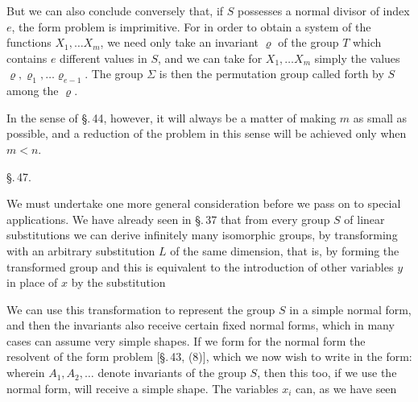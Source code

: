 

But we can also conclude conversely that, if $S$ possesses a normal divisor of index $e$, the form problem is imprimitive. For in order to obtain a system of the functions $X_1, \ldots X_m$, we need only take an invariant $\varrho$ of the group $T$ which contains $e$ different values in $S$, and we can take for $X_1, \ldots X_m$ simply the values $\varrho, \varrho_1, \ldots \varrho_{e-1}$. The group $\Sigma$ is then the permutation group called forth by $S$ among the $\varrho$.

In the sense of \S.\,44, however, it will always be a matter of making $m$ as small as possible, and a reduction of the problem in this sense will be achieved only when $m < n$.

\begin{center}
\S.\,47.

\end{center}

We must undertake one more general consideration before we pass on to special applications. We have already seen in \S.\,37 that from every group $S$ of linear substitutions we can derive infinitely many isomorphic groups, by transforming with an arbitrary substitution $L$ of the same dimension, that is, by forming the transformed group
and this is equivalent to the introduction of other variables $y$ in place of $x$ by the substitution

We can use this transformation to represent the group $S$ in a simple normal form, and then the invariants also receive certain fixed normal forms, which in many cases can assume very simple shapes. If we form for the normal form the resolvent of the form problem [\S.\,43, (8)], which we now wish to write in the form:
wherein $A_1, A_2, \ldots$ denote invariants of the group $S$, then this too, if we use the normal form, will receive a simple shape. The variables $x_i$ can, as we have seen
